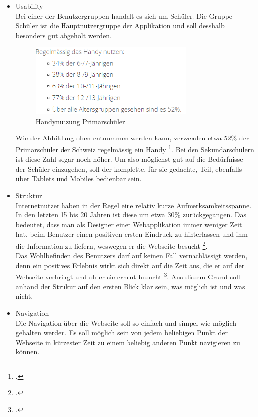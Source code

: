 \begin{itemize}
	\item Usability \\
		Bei einer der Benutzergruppen handelt es sich um Schüler. Die Gruppe Schüler ist die Hauptnutzergruppe der Applikation und soll desshalb besonders gut abgeholt werden. \\
		
\begin{minipage}{\textwidth}
	\begin{figure}[H]
	\centering
		\includegraphics[width=8cm, keepaspectratio]{images/HandyNutzung.png}
		\caption{Handynutzung Primarschüler}
	\end{figure}
\end{minipage}
		
		Wie der Abbildung oben entnommen werden kann, verwenden etwa 52\% der Primarschüler der Schweiz regelmässig ein Handy \footcite{smartphone_usage}. Bei den Sekundarschülern ist diese Zahl sogar noch höher. Um also möglichst gut auf die Bedürfnisse der Schüler einzugehen, soll der komplette, für sie gedachte, Teil, ebenfalls über Tablets und Mobiles bedienbar sein.
		
	\item Struktur \\
		Internetnutzer haben in der Regel eine relativ kurze Aufmerksamkeitsspanne. In den letzten 15 bis 20 Jahren ist diese um etwa 30\% zurückgegangen. Das bedeutet, dass man als Designer einer Webapplikation immer weniger Zeit hat, beim Benutzer einen positiven ersten Eindruck zu hinterlassen und ihm die Information zu liefern, weswegen er die Webseite besucht \footcite{attention_span}. \\ 
		Das Wohlbefinden des Benutzers darf auf keinen Fall vernachlässigt werden, denn ein positives Erlebnis wirkt sich direkt auf die Zeit aus, die er auf der Webseite verbringt und ob er sie erneut besucht \footcite{positiv_experience}.
		Aus diesem Grund soll anhand der Strukur auf den ersten Blick klar sein, was möglich ist und was nicht.
		
	\item Navigation \\
		Die Navigation über die Webseite soll so einfach und simpel wie möglich gehalten werden. Es soll möglich sein von jedem beliebigen Punkt der Webseite in kürzester Zeit zu einem beliebig anderen Punkt navigieren zu können.
	

\end{itemize}
